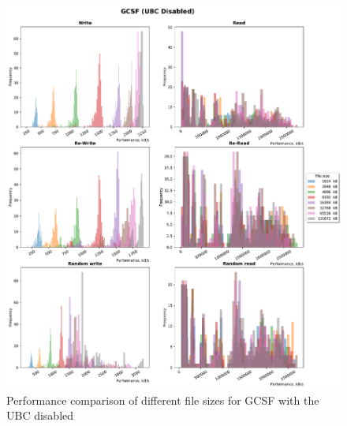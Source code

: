 \begin{figure}[!htb]
	\label{fig:bench_gcsf_without_cache}
	\begin{center}
		\includegraphics[width=1.0\textwidth]{figures.nosync/benchmarking/GCSF/GCSF-UBC Disabled-hist.pdf}
	\end{center}
	\caption[Performance comparison for GCSF with the UBC disabled]{Performance comparison of different file sizes for GCSF with the UBC disabled}
\end{figure}
\clearpage


